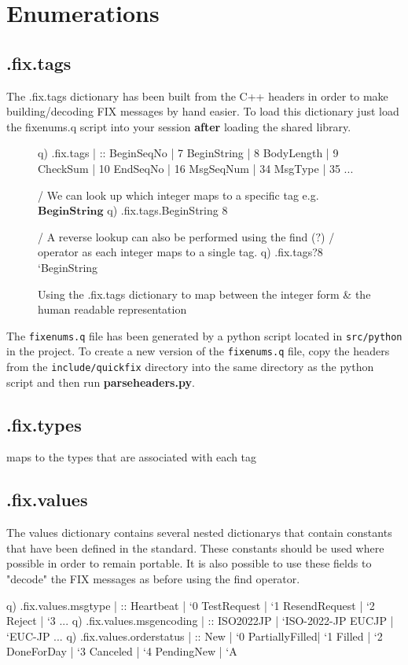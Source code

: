 \section{Enumerations}
\subsection{.fix.tags}
The .fix.tags dictionary has been built from the C++ headers in order to make building/decoding FIX messages by hand easier. To load this dictionary just load
the fixenums.q script into your session \textbf{after} loading the shared library.\\

\begin{figure}[H]
\begin{qcode}
q) .fix.tags
               | ::
BeginSeqNo     | 7
BeginString    | 8
BodyLength     | 9
CheckSum       | 10
EndSeqNo       | 16
MsgSeqNum      | 34
MsgType        | 35
...

/ We can look up which integer maps to a specific tag e.g. $\textbf{BeginString}$
q) .fix.tags.BeginString
8

/ A reverse lookup can also be performed using the find ($\textbf{?}$) 
/ operator as each integer maps to a single tag.
q) .fix.tags?8
`BeginString
\end{qcode}
\caption{Using the .fix.tags dictionary to map between the integer form \& the human readable representation}
\label{fig:tags}
\end{figure}

The \verb|fixenums.q| file has been generated by a python script located in
\verb|src/python| in the project. To create a new version of the \verb|fixenums.q| file, copy the headers from the \verb|include/quickfix| directory into the same
directory as the python script and then run \textbf{parseheaders.py}.

\subsection{.fix.types}
	maps to the types that are associated with each tag

\subsection{.fix.values}

The values dictionary contains several nested dictionarys that contain constants that
have been defined in the standard. These constants should be used where possible in order to remain
portable. It is also possible to use these fields to "decode" the FIX messages as before using the
find operator.

\begin{qcode}
q) .fix.values.msgtype
               | ::
Heartbeat      | `0
TestRequest    | `1
ResendRequest  | `2
Reject         | `3
...
q) .fix.values.msgencoding
               | ::
ISO2022JP      | `ISO-2022-JP
EUCJP          | `EUC-JP
...
q) .fix.values.orderstatus
               | ::
New            | `0
PartiallyFilled| `1
Filled         | `2
DoneForDay     | `3
Canceled       | `4
PendingNew     | `A
\end{qcode}

